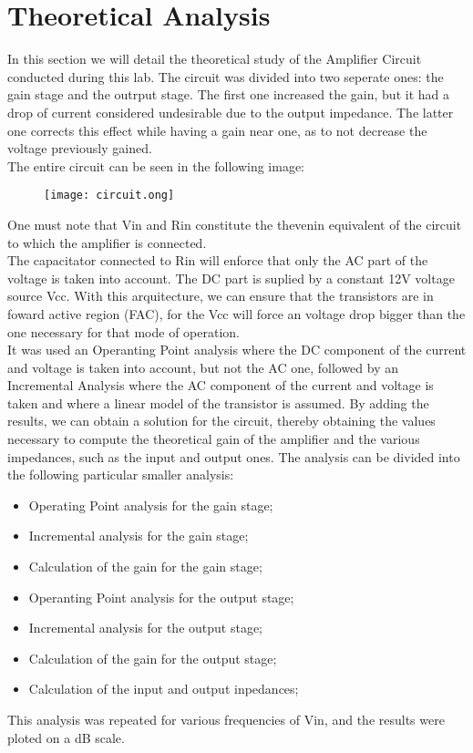 \section{Theoretical Analysis}
\label{sec:analysis}


In this section we will detail the theoretical study of the Amplifier Circuit conducted during this lab. The circuit was divided into two seperate ones: the gain stage and the outrput stage. The first one increased the gain, but it had a drop of current considered undesirable due to the output impedance. The latter one corrects this effect while having a gain near one, as to not decrease the voltage previously gained.\\
The entire circuit can be seen in the following image:\\

\FloatBarrier

\begin{figure}
  \texttt{[image: circuit.ong]}
  \caption{}
  \label{}
\end{figure}
\FloatBarrier

One must note that Vin and Rin constitute the thevenin equivalent of the circuit to which the amplifier is connected.\\
The capacitator connected to Rin will enforce that only the AC part of the voltage is taken into account. The DC part is suplied by a constant 12V voltage source Vcc. With this arquitecture, we can ensure that the transistors are in foward active region (FAC), for the Vcc will force an voltage drop bigger than the one necessary for that mode of operation.\\
It was used an Operanting Point analysis where the DC component of the current and voltage is taken into account, but not the AC one, followed by an Incremental Analysis where the AC component of the current and voltage is taken and where a linear model of the transistor is assumed. By adding the results, we can obtain a solution for the circuit, thereby obtaining the values necessary to compute the theoretical gain of the amplifier and the various impedances, such as the input and output ones.
The analysis can be divided into the following particular smaller analysis:
\begin{itemize}
	\item Operating Point analysis for the gain stage;
	\item Incremental analysis for the gain stage;
	\item Calculation of the gain for the gain stage;
	\item Operanting Point analysis for the output stage;
	\item Incremental analysis for the output stage;
	\item Calculation of the gain for the output stage;
	\item Calculation of the input and output inpedances;
\end{itemize}
This analysis was repeated for various frequencies of Vin, and the results were ploted on a dB scale.

